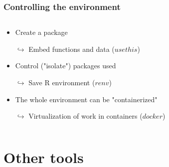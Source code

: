 \documentclass[xcolor=x11names,compress]{beamer}
\renewcommand{\(}{\begin{columns}}
\renewcommand{\)}{\end{columns}}
\newcommand{\<}[1]{\begin{column}{#1}}
\renewcommand{\>}{\end{column}}
\begin{document}
\begin{frame}
\frametitle{Controlling the environment}
\begin{columns}[t]
 \begin{column}{0.8\textwidth}
 \begin{itemize}[<+->]
        \item Create a package
        \item[$\hookrightarrow$] Embed functions and data ($usethis$)
        \item Control ("isolate") packages used 
        \item[$\hookrightarrow$] Save R environment ($renv$)
        \item The whole environment can be "containerized" 
        \item[$\hookrightarrow$] Virtualization of work in containers ($docker$)
    \end{itemize}
 \end{column}
  \begin{column}{0.2\textwidth}
    \begin{center}
    \begin{itemize}
    \end{itemize}
    \end{center}
  \end{column}
\end{columns}
\end{frame}


\section{Other tools}
\end{document}
